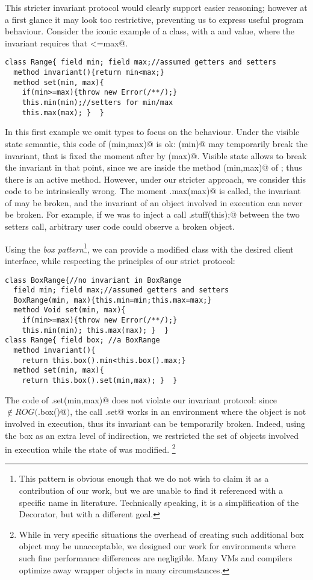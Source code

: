 This stricter invariant protocol would clearly support easier reasoning; however 
at a first glance it may look too restrictive, preventing us to express useful program behaviour.
Consider the iconic example of a \Q@Range@ class, with a \Q@min@ and \Q@max@
value, where the invariant requires that \Q@min<=max@.
\begin{lstlisting}
class Range{ field min; field max;//assumed getters and setters
  method invariant(){return min<max;}
  method set(min, max){
    if(min>=max){throw new Error(/**/);}
    this.min(min);//setters for min/max
    this.max(max); }  }
\end{lstlisting}
In this first example we omit types to focus on the behaviour.
Under the visible state semantic, this code of \Q@set(min,max)@ is ok:
\Q@min(min)@ may temporarily break the invariant, that is fixed the moment
after by \Q@max(max)@. Visible state allows to break the invariant in that point, since
we are inside the method \Q@set(min,max)@ of \Q@Range@; thus there is an active method.
However, under our stricter approach, we consider this code to be intrinsically wrong. The moment
\Q@this.max(max)@ is called, the invariant of \Q@this@ may be broken, and
the invariant of an object involved in execution can never be broken. For example, if we was to inject a call
\Q@Do.stuff(this);@ between the two setters call,
arbitrary user code could observe a broken object.

Using the \emph{box pattern}\footnote{
This pattern is obvious enough that we do not wish to claim it as a contribution of our work,
but we are unable to find it referenced with a specific name in literature. Technically speaking, it is a simplification of the Decorator, but with a different goal.}, we can provide a modified
\Q@Range@ class with the desired client interface, while respecting the principles of our strict protocol:
\begin{lstlisting}
class BoxRange{//no invariant in BoxRange
  field min; field max;//assumed getters and setters
  BoxRange(min, max){this.min=min;this.max=max;}
  method Void set(min, max){
    if(min>=max){throw new Error(/**/);}
    this.min(min); this.max(max); }  }
class Range{ field box; //a BoxRange
  method invariant(){
    return this.box().min<this.box().max;}
  method set(min, max){
    return this.box().set(min,max); }  }
\end{lstlisting}
The code of \Q@Range.set(min,max)@ does not violate our invariant protocol:
  since \Q@this@ $\notin \mathit{ROG}($\Q@this.box()@$)$, the call
\Q@BoxRange.set@ works in an environment where the \Q@Range@ object is
not involved in execution, thus its invariant can be temporarily broken.
Indeed, using the box as an extra level of indirection, we restricted the set of objects involved in execution while the state of \Q@Range@ was modified.
\footnote{While in very specific situations the overhead of creating such additional box object may be unacceptable, 
we designed our work for environments where such fine performance differences are negligible.
Many VMs and compilers optimize away wrapper objects in many circumstances.\cite{help}}


